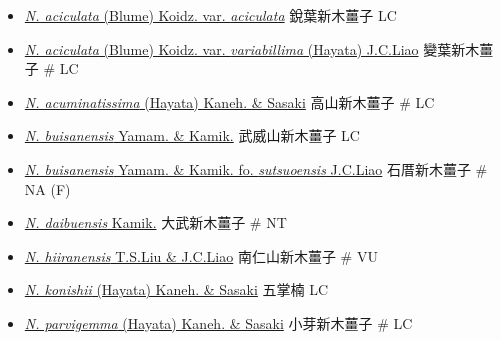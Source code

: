 \begin{itemize}
  \begin{itemize}
        \item[] \href{http://www.theplantlist.org/tpl1.1/search?q=Neolitsea+aciculata+var.+aciculata}{\textit{N. aciculata} (Blume) Koidz. var. \textit{aciculata}}   銳葉新木薑子   LC
        \item[] \href{http://www.theplantlist.org/tpl1.1/search?q=Neolitsea+aciculata+var.+variabillima}{\textit{N. aciculata} (Blume) Koidz. var. \textit{variabillima} (Hayata) J.C.Liao}   變葉新木薑子  \# LC
        \item[] \href{http://www.theplantlist.org/tpl1.1/search?q=Neolitsea+acuminatissima}{\textit{N. acuminatissima} (Hayata) Kaneh. \& Sasaki}   高山新木薑子  \# LC
        \item[] \href{http://www.theplantlist.org/tpl1.1/search?q=Neolitsea+buisanensis}{\textit{N. buisanensis} Yamam. \& Kamik.}   武威山新木薑子   LC
        \item[] \href{http://www.theplantlist.org/tpl1.1/search?q=Neolitsea+buisanensis+fo.+sutsuoensis}{\textit{N. buisanensis} Yamam. \& Kamik. fo. \textit{sutsuoensis} J.C.Liao}   石厝新木薑子  \# NA (F)
        \item[] \href{http://www.theplantlist.org/tpl1.1/search?q=Neolitsea+daibuensis}{\textit{N. daibuensis} Kamik.}   大武新木薑子  \# NT
        \item[] \href{http://www.theplantlist.org/tpl1.1/search?q=Neolitsea+hiiranensis}{\textit{N. hiiranensis} T.S.Liu \& J.C.Liao}   南仁山新木薑子  \# VU
        \item[] \href{http://www.theplantlist.org/tpl1.1/search?q=Neolitsea+konishii}{\textit{N. konishii} (Hayata) Kaneh. \& Sasaki}   五掌楠   LC
        \item[] \href{http://www.theplantlist.org/tpl1.1/search?q=Neolitsea+parvigemma}{\textit{N. parvigemma} (Hayata) Kaneh. \& Sasaki}   小芽新木薑子  \# LC

\end{itemize}
\end{itemize}
